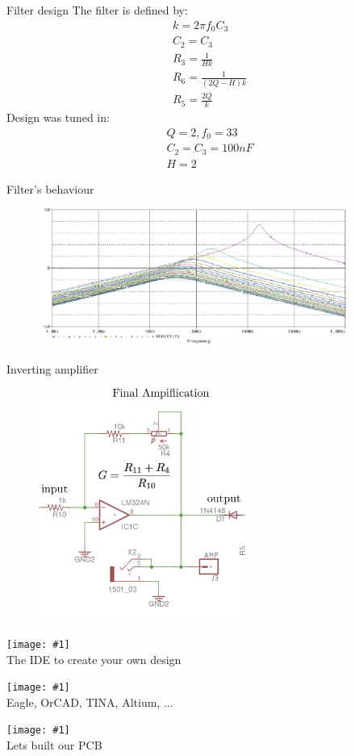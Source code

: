 \documentclass[newPxFont]{beamer}
\newcommand \imageFrame[2]{
\begingroup
\begin{frame}
  \begin{center}
\texttt{[image: \#1]}\\
\Large #2
    \end{center}
\end{frame}
\endgroup
}
\begin{document}
\begin{frame}{Filter design}
The filter is defined by:
\begin{eqnarray*}
  k=2\pi f_0C_3\\
  C_2=C_3\\
  R_3=\frac{1}{Hk}\\
  R_6=\frac{1}{(2Q-H)k}\\
  R_5=\frac{2Q}{k}
\end{eqnarray*}
Design was tuned in:
\begin{eqnarray*}
  Q=2, f_0=33\\
  C_2=C_3=100nF\\
  H=2
\end{eqnarray*}

\end{frame}
\begin{frame}{Filter's behaviour}
\begin{figure}
  \includegraphics[width=4in]{filterBehaviour}
\end{figure}
\end{frame}
\begin{frame}{Inverting amplifier}
\begin{figure}
  \includegraphics[height=3in]{ampStage}
\end{figure}
\end{frame}
\imageFrame{eagle}{The IDE to create your own design}
\imageFrame{pcbProcess}{Eagle, OrCAD, TINA, Altium, ...}
\imageFrame{homerLab}{Lets built our PCB}
\end{document}
